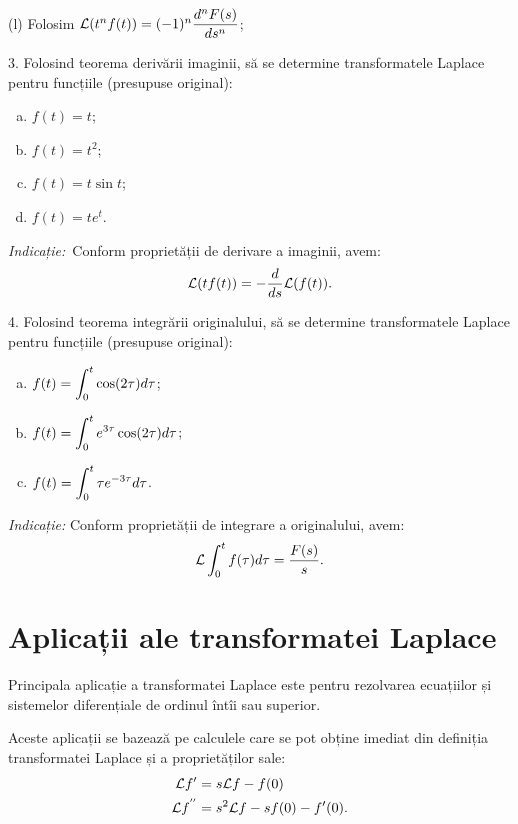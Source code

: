 (l) Folosim $ \mathcal{L}(t^n f(t)) = (-1)^n \dfrac{d^n F(s)}{ds^n} $;

\vspace{1cm}

3. Folosind teorema derivării imaginii, să se determine transformatele Laplace pentru funcțiile
(presupuse original):
\begin{enumerate}[(a)]
\item $ f(t) = t $;
\item $ f(t) = t^2 $;
\item $ f(t) = t\sin t $;
\item $ f(t) = te^t $.
\end{enumerate}

\emph{Indicație:} Conform proprietății de derivare a imaginii, avem:
\[
  \mathcal{L} (t f(t)) = -\frac{d}{ds} \mathcal{L} (f(t)).
\]

\vspace{1cm}

4. Folosind teorema integrării originalului, să se determine transformatele Laplace pentru
funcțiile (presupuse original):
\begin{enumerate}[(a)]
\item $ f(t) = \displaystyle\int_0^t \cos (2\tau) d\tau $;
\item $ f(t) = \displaystyle\int_0^t e^{3 \tau} \cos(2 \tau) d\tau $;
\item $ f(t) = \displaystyle\int_0^t \tau e^{-3\tau} d\tau $.
\end{enumerate}

\emph{Indicație:} Conform proprietății de integrare a originalului,
avem:
\[
  \mathcal{L} \int_0^t f(\tau) d\tau = \frac{F(s)}{s}.
\]



\section{Aplicații ale transformatei Laplace}

Principala aplicație a transformatei Laplace este pentru rezolvarea ecuațiilor și
sistemelor diferențiale de ordinul întîi sau superior.

Aceste aplicații se bazează pe calculele care se pot obține imediat din definiția
transformatei Laplace și a proprietăților sale:
\begin{align*}
  \mathcal{L} f' &= s \mathcal{L} f - f(0) \\
  \mathcal{L} f^{''} &= s^2 \mathcal{L} f - sf(0) - f'(0).
\end{align*}

